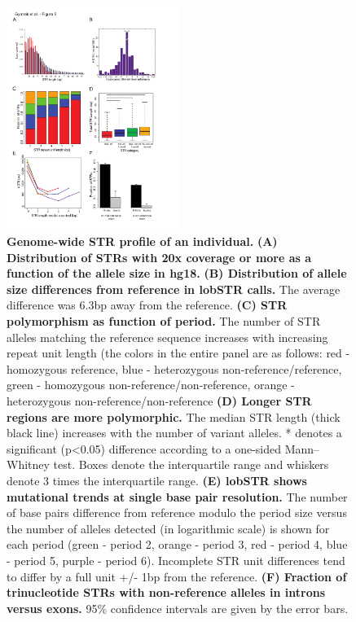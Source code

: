 \begin{figure}[h!]
\centering
\label{fig:lobfig5}
\includegraphics[width=0.5\textwidth]{Figures/Chapter2/Fig5.pdf}
\caption{\textbf{Genome-wide STR profile of an individual.} \textbf{(A) Distribution of STRs with 20x coverage or more as a function of the allele size in hg18.} \textbf{(B) Distribution of allele size differences from reference in lobSTR calls.} The average difference was 6.3bp away from the reference. \textbf{(C) STR polymorphism as function of period.} The number of STR alleles matching the reference sequence increases with increasing repeat unit length (the colors in the entire panel are as follows: red - homozygous reference, blue - heterozygous non-reference/reference, green - homozygous non-reference/non-reference, orange - heterozygous non-reference/non-reference \textbf{(D) Longer STR regions are more polymorphic.} The median STR length (thick black line) increases with the number of variant alleles. * denotes a significant (p<0.05) difference according to a one-sided Mann–Whitney test. Boxes denote the interquartile range and whiskers denote 3 times the interquartile range. \textbf{(E) lobSTR shows mutational trends at single base pair resolution.} The number of base pairs difference from reference modulo the period size versus the number of alleles detected (in logarithmic scale) is shown for each period (green - period 2, orange - period 3, red - period 4, blue - period 5, purple - period 6). Incomplete STR unit differences tend to differ by a full unit +/- 1bp from the reference. \textbf{(F) Fraction of trinucleotide STRs with non-reference alleles in introns versus exons.} 95\% confidence intervals are given by the error bars.}
\end{figure}

